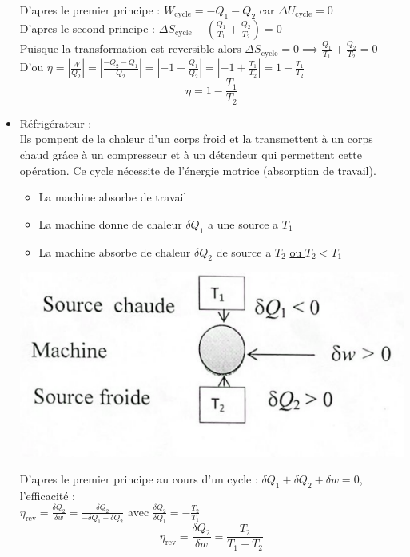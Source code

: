 \documentclass[12pt,oneside]{book}
\begin{document}
\begin{itemize}
\begin{minipage}{0.4\linewidth}
          \end{minipage}
          D'apres le premier principe : $W_\text{cycle} = -Q_1 -Q_2$ car $\Delta U_\text{cycle} = 0$\\
          D'apres le second principe : $\Delta S_\text{cycle} -(\frac{Q_1}{T_1}+\frac{Q_2}{T_2} ) = 0$\\
          Puisque la transformation est reversible alors $\Delta S_\text{cycle} = 0 \implies \frac{Q_1}{T_1} + \frac{Q_2}{T_2} = 0$\\
          D'ou $\eta = |\frac{W}{Q_2}| = |\frac{-Q_2-Q_1}{Q_2}| = |-1 - \frac{Q_1}{Q_2}| = |-1 + \frac{T_1}{T_2}| = 1 - \frac{T_1}{T_2}$ \\
          \[\boxed{ \eta = 1 - \frac{T_1}{T_2} }\]
    \item Réfrigérateur : \\
          Ils pompent de la chaleur d'un corps froid et la transmettent à un corps chaud grâce à un compresseur et à un détendeur qui permettent cette opération.
          Ce cycle nécessite de l'énergie motrice (absorption de travail).\\

          \begin{minipage}{0.6\linewidth}
              \begin{itemize}
                  \item La machine absorbe de travail
                  \item La machine donne de chaleur $\delta Q_1$ a une source a $T_1$
                  \item La machine absorbe de chaleur $\delta Q_2$ de source a $T_2$ \underline{ou $T_2 < T_1$}
              \end{itemize}
          \end{minipage}
          \begin{minipage}{0.4\linewidth}
              \includegraphics[width=\linewidth]{../pic/3300/5}
          \end{minipage}
          D'apres le premier principe au cours d'un cycle : $\delta Q_1 + \delta Q_2 + \delta w = 0$, l’efficacité : \\
          $\eta_\text{rev} = \frac{\delta Q_2}{\delta w} = \frac{\delta Q_2}{-\delta Q_1-\delta Q_2}$ avec $\frac{\delta Q_2}{\delta Q_1} = - \frac{T_2}{T_1}$
          \[\boxed{ \eta_\text{rev} = \frac{\delta Q_2}{\delta w}=\frac{T_2}{T_1-T_2} }\]
\end{itemize}
\end{document}
